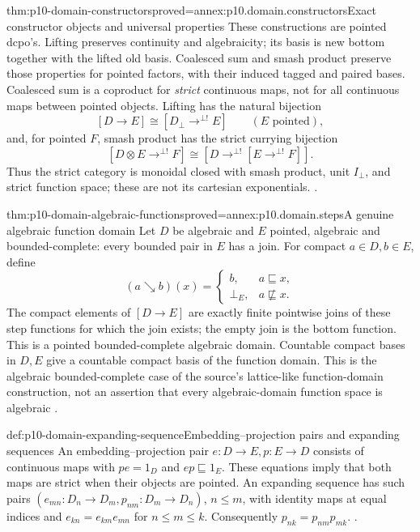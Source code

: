 \begin{hbtheorem}{thm:p10-domain-constructors}{proved=annex:p10.domain.constructors}{Exact constructor objects and universal properties}
These constructions are pointed dcpo's. Lifting preserves continuity
and algebraicity; its basis is new bottom together with the lifted old
basis. Coalesced sum and smash product preserve those properties for
pointed factors, with their induced tagged and paired bases.
Coalesced sum is a coproduct for \emph{strict} continuous maps, not
for all continuous maps between pointed objects. Lifting has the
natural bijection
\[
 [D\longrightarrow E]\cong
 [D_{\bot}\mathrel{\mathop{\longrightarrow}^{\bot!}}E]
                    \qquad(E\text{ pointed}),
\]
and, for pointed \(F\), smash product has the strict currying bijection
\[
 [D\otimes E\mathrel{\mathop{\longrightarrow}^{\bot!}}F]
 \cong
 [D\mathrel{\mathop{\longrightarrow}^{\bot!}}
      [E\mathrel{\mathop{\longrightarrow}^{\bot!}}F]].
\]
Thus the strict category is monoidal closed with smash product,
unit \(I_{\bot}\), and strict function space; these are not its
cartesian exponentials.
\cite[Propositions~3.2.8--9; Sections~3.2.4--5, pp.~44--45]
{AbramskyJungCorrectedExpandedDomainTheory}.
\end{hbtheorem}

\begin{hbtheorem}{thm:p10-domain-algebraic-functions}{proved=annex:p10.domain.steps}{A genuine algebraic function domain}
Let \(D\) be algebraic and \(E\) pointed, algebraic and
bounded-complete: every bounded pair in \(E\) has a join.
For compact \(a\in D,b\in E\), define
\[
 (a\mathbin{\searrow}b)(x)=
 \begin{cases}b,&a\sqsubseteq x,\\\bot_E,&a\not\sqsubseteq x.\end{cases}
\]
The compact elements of \([D\longrightarrow E]\) are exactly
finite pointwise joins of these step functions for which the join
exists; the empty join is the bottom function. This is a pointed
bounded-complete algebraic domain. Countable compact bases in \(D,E\)
give a countable compact basis of the function domain.
This is the algebraic bounded-complete case of the source's
lattice-like function-domain construction, not an assertion that
every algebraic-domain function space is algebraic
\cite[pp.~54--57, Proposition~4.1.5]
{AbramskyJungCorrectedExpandedDomainTheory}.
\end{hbtheorem}

\begin{hbdefinition}{def:p10-domain-expanding-sequence}{Embedding--projection pairs and expanding sequences}
An embedding--projection pair \(e:D\to E,p:E\to D\) consists
of continuous maps with \(pe=1_D\) and \(ep\sqsubseteq1_E\).
These equations imply that both maps are strict when their objects
are pointed. An expanding sequence has such pairs
\((e_{mn}:D_n\to D_m,p_{nm}:D_m\to D_n)\), \(n\le m\),
with identity maps at equal indices and
\(e_{kn}=e_{km}e_{mn}\) for \(n\le m\le k\).
Consequently \(p_{nk}=p_{nm}p_{mk}\).
\cite[Definition~3.1.15; Definition~3.3.6, pp.~39,48]
{AbramskyJungCorrectedExpandedDomainTheory}.
\end{hbdefinition}

